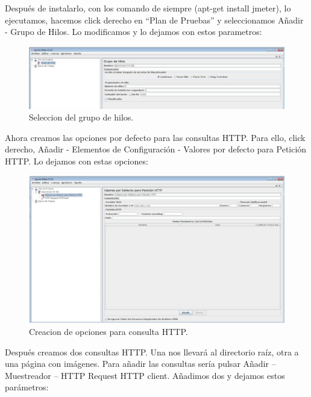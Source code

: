 Después de instalarlo, con los comando de siempre (apt-get install jmeter), lo ejecutamos, hacemos click derecho en “Plan de Pruebas” y seleccionamos Añadir - Grupo de Hilos. Lo modificamos y lo dejamos con estos parametros:

\begin{figure}[H]
\begin{center}
\includegraphics[scale=0.4]{imagenes/imagen4-1.eps}
\caption{Seleccion del grupo de hilos.}
\end{center}
\end{figure}

Ahora creamos las opciones por defecto para las consultas HTTP. Para ello, click  derecho, Añadir - Elementos de Configuración - Valores por defecto para  Petición HTTP. Lo dejamos con estas opciones:
\begin{figure}[H]
\begin{center}
\includegraphics[scale=0.3]{imagenes/imagen4-2.eps}
\caption{Creacion de opciones para consulta HTTP.}
\end{center}
\end{figure}

Después creamos dos consultas HTTP. Una nos llevará al directorio raíz, otra a una  página con imágenes. Para añadir las consultas sería pulsar Añadir -- Muestreador -- HTTP Request HTTP client. Añadimos dos y dejamos estos parámetros:

